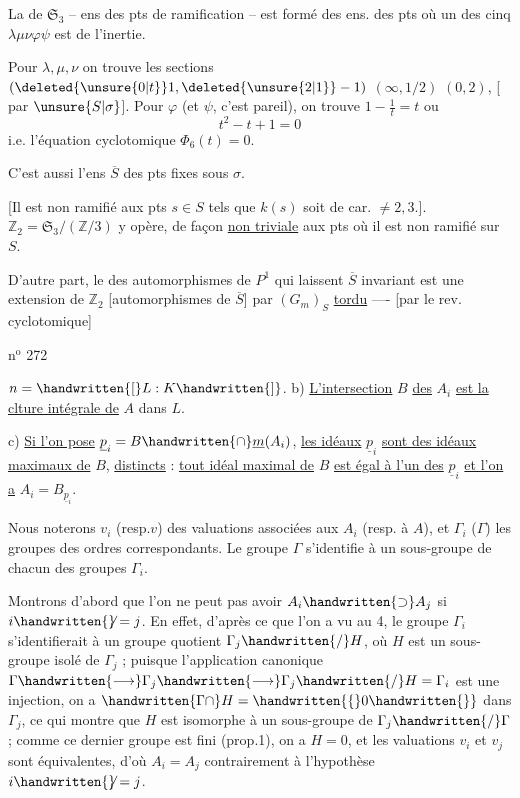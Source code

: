 La  de $\mathfrak{S}_3$ -- ens des pts de ramification -- est formé des ens. des pts où un des cinq  $\lambda\mu\nu\varphi\psi$ est de l'inertie.

Pour $\lambda,\mu,\nu$ on trouve les sections $(\deleted{\unsure{0|t}}1,\deleted{\unsure{2|1}}-1)$ $(\infty,1/2)$ $(0,2)$, [ par $\unsure{S|\sigma}$]. Pour $\varphi$ (et $\psi$, c'est pareil), on trouve $1-\frac1t=t$ ou
\begingroup\makeatletter\tagsleft@true\makeatother
\[
t^2-t+1=0\tag*{8)}
\]
\endgroup
i.e. l'équation cyclotomique $\boxed{\Phi_6(t)=0}$. 

 C'est aussi l'ens $\overline{S}$ des pts fixes sous $\sigma$.

[Il est non ramifié  aux pts $s\in S$ tels que $k(s)$ soit de car. $\ne2,3$.]. $\mathbb{Z}_2=\mathfrak{S}_3/(\mathbb{Z}/3)$ y\unsure{:|} opère, de façon \uline{non triviale} aux pts où il est non ramifié sur $S$.

D'autre part, le   des automorphismes de $P^1$ qui laissent $\overline{S}$  invariant est une extension de $\mathbb{Z}_2$ [automorphismes de $\overline{S}$] par $(G_m)_S$ \uline{tordu} ---- [par le rev. cyclotomique]

\hfill n$^{\mathrm{o}}$ 272

$n=\handwritten{[}L:K\handwritten{]}$. \quad b) \uline{L'intersection} $B$ \uline{des} $A_i$ \uline{est la clture intégrale de} $A$ dans $L$.

c) \uline{Si l'on pose} $\underline{p}_i=B\handwritten{\cap}\underline{m}(A_i)$, \uline{les idéaux} $\underline{p}_i$ \uline{sont des idéaux maximaux de} $B$, \uline{distincts} : \uline{tout idéal maximal de} $B$ \uline{est égal à l'un des} $\underline{p}_i$ \uline{et l'on a}  $A_i=B_{\underline{p}_i}$.

Nous noterons $v_i$ (resp.$v$) des valuations associées aux $A_i$ (resp. à $A$), et $\Gamma_i$ ($\Gamma$) les groupes des ordres correspondants. Le groupe $\Gamma$ s'identifie à un sous-groupe de chacun des groupes $\Gamma_i$.

Montrons d'abord que l'on ne peut pas avoir $A_i\handwritten{\supset}A_j$ si $i\handwritten{\not}=j$. En effet, d'après ce que l'on a vu au \handwritten{\S}4, le groupe $\Gamma_i$ s'identifierait à un groupe quotient $\Gamma_j\handwritten{/}H$, où $H$ est un sous-groupe isolé de $\Gamma_j$ ; puisque l'application canonique $\Gamma\handwritten{\longrightarrow}\Gamma_j\handwritten{\longrightarrow}\Gamma_j\handwritten{/}H=\Gamma_i$ est une injection, on a $\handwritten{\Gamma\cap}H=\handwritten{\{}0\handwritten{\}}$ dans $\Gamma_j$, ce qui montre que $H$ est isomorphe à un sous-groupe de $\Gamma_j\handwritten{/}\Gamma$ ; comme ce dernier groupe est fini (prop.1), on a $H=0$, et les valuations $v_i$ et $v_j$ sont équivalentes, d'où $A_i=A_j$ contrairement à l'hypothèse $i\handwritten{\not}=j$.

